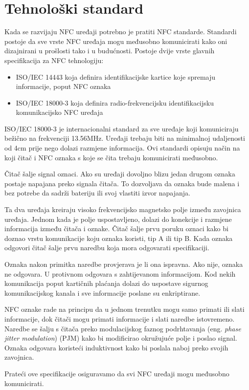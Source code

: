 \documentclass[times, utf8, zavrsni]{fer}
\begin{document}
\section{Tehnološki standard}
Kada se razvijaju NFC uređaji potrebno je pratiti NFC standarde. Standardi postoje da sve vrste NFC uređaja mogu međusobno komunicirati kako oni dizajnirani u prošlosti tako i u budućnosti. Postoje dvije vrste glavnih specifikacija za NFC tehnologiju:
\begin{itemize}
\item ISO/IEC 14443 koja definira identifikacijske kartice koje spremaju informacije, poput NFC oznaka
\item ISO/IEC 18000-3 koja definira radio-frekvencijsku identifikacijsku komunikacijsko NFC uređaja
\end{itemize}\par 
ISO/IEC 18000-3 je internacionalni standard za sve uređaje koji komuniciraju bežično na frekvenciji 13.56MHz. Uređaji trebaju biti na minimalnoj udaljenosti od 4cm prije nego dolazi razmjene informacija. Ovi standardi opisuju način na koji čitač i NFC oznaka s koje se čita trebaju komunicirati međusobno.\par
Čitač šalje signal oznaci. Ako su uređaji dovoljno blizu jedan drugom oznaka postaje napajana preko signala čitača. To dozvoljava da oznaka bude malena i bez potrebe da sadrži bateriju ili svoj vlastiti izvor napajanja.\par
Ta dva uređaja kreiraju visoko frekvencijsko magnetsko polje između zavojnica uređaja. Jednom kada je polje uspostavljeno, dolazi do konekcije i razmjene informacija između čitača i oznake. Čitač šalje prvu poruku oznaci kako bi doznao vrstu komunikacije koju oznaka koristi, tip A ili tip B. Kada oznaka odgovori čitač šalje prvu naredbu koja mora odgovarati specifikaciji.\par 
Oznaka nakon primitka naredbe provjerava je li ona ispravna. Ako nije, oznaka ne odgovara. U protivnom odgovara s zahtijevanom informacijom. Kod  nekih komunikacija poput kartičnih plaćanja dolazi do uspostave sigurnog komunikacijskog kanala i sve informacije poslane su enkriptirane.\par 
NFC oznake rade na principu da u jednom trenutku mogu samo primati ili slati informacije, dok čitači mogu primati informacije i slati naredbe istovremeno. Naredbe se šalju s čitača preko modulacijskog faznog podrhtavanja (eng. \textit{phase jitter modulation}) (PJM) kako bi modificirao okružujuće polje i poslao signal. Oznaka odgovara koristeći induktivnost kako bi poslala naboj preko svojih zavojnica.\par 
Prateći ove specifikacije osiguravamo da svi NFC uređaji mogu međusobno komunicirati.
\citep{4}
\end{document}
